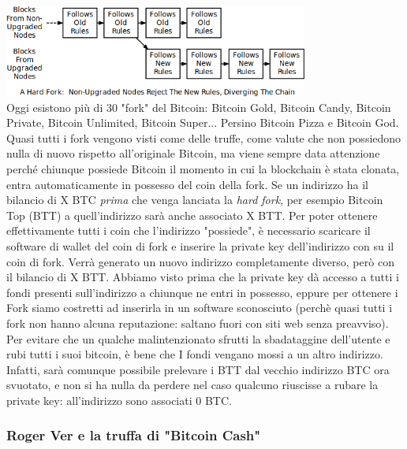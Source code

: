 \documentclass {article}
\begin{document}
{\vspace {0.5cm}
\includegraphics [width = 10cm] {media/hard_fork.png}
\vspace {0.5cm}
\\
Oggi esistono più di 30 "fork" del Bitcoin: Bitcoin Gold, Bitcoin Candy, Bitcoin Private, Bitcoin Unlimited, Bitcoin Super... Persino Bitcoin Pizza e Bitcoin God.
Quasi tutti i fork vengono visti come delle truffe, come valute che non possiedono nulla di nuovo rispetto all'originale Bitcoin, ma viene sempre data attenzione perché chiunque possiede Bitcoin il momento in cui la blockchain è stata clonata, entra automaticamente in possesso del coin della fork.
Se un indirizzo ha il bilancio di X BTC \emph{prima} che venga lanciata la \textit{hard fork}, per esempio Bitcoin Top (BTT) a quell'indirizzo sarà anche associato X BTT.
Per poter ottenere effettivamente tutti i coin che l'indirizzo "possiede", è necessario scaricare il software di wallet del coin di fork e inserire la private key dell'indirizzo con su il coin di fork.
Verrà generato un nuovo indirizzo completamente diverso, però con il bilancio di X BTT.
Abbiamo visto prima che la private key dà accesso a tutti i fondi presenti sull'indirizzo a chiunque ne entri in possesso, eppure per ottenere i Fork siamo costretti ad inserirla in un software sconosciuto (perchè quasi tutti i fork non hanno alcuna reputazione: saltano fuori con siti web senza preavviso).
Per evitare che un qualche malintenzionato sfrutti la sbadataggine dell'utente e rubi tutti i suoi bitcoin, è bene che I fondi vengano mossi a un altro indirizzo.
Infatti, sarà comunque possibile prelevare i BTT dal vecchio indirizzo BTC ora svuotato, e non si ha nulla da perdere nel caso qualcuno riuscisse a rubare la private key: all'indirizzo sono associati 0 BTC.


\subsubsection {Roger Ver e la truffa di "Bitcoin Cash"}


}
\end{document}
